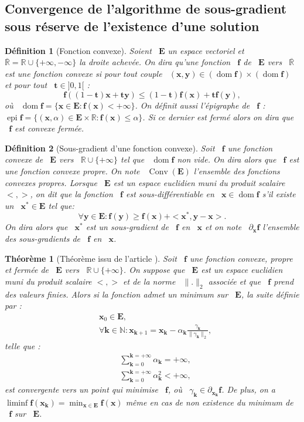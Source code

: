 \documentclass[publibook-draft]{CAp2012}
\newtheorem{definition}{Définition}
\newtheorem{theorem}{Théorème}
\newcommand{\dom}{\operatorname*{dom}}
\newcommand{\epi}{\operatorname{epi}}
\newcommand{\conv}{\operatorname*{Conv}}
\newcommand{\af}{\mathbf{f}}
\newcommand{\bk}{\mathbf{k}}
\newcommand{\bt}{\mathbf{t}}
\newcommand{\bx}{\mathbf{x}}
\newcommand{\by}{\mathbf{y}}
\newcommand{\me}{\mathbf{E}}
\begin{document}
\subsection{Convergence de l'algorithme de sous-gradient sous réserve de l'existence d'une solution}
\begin{definition}[Fonction convexe]
Soient ~$\me$ un espace vectoriel et ~$\overline{\mathbb{R}}=\mathbb{R}\cup\{+\infty,-\infty\}$ la droite achevée. On dira qu'une fonction ~$\af$ de ~$\me$ vers ~$\overline{\mathbb{R}}$ est une fonction convexe si pour tout couple ~$(\bx,\by)\in(\dom\af)\times(\dom\af)$ et pour tout ~$\bt\in]0,1[$ :
\begin{equation}
\af((1-\bt)\bx+\bt\by)\leq(1-\bt)\af(\bx)+\bt\af(\by),
\end{equation}
où ~$\dom\af=\{\bx\in\me:\af(\bx)<+\infty\}$.
On définit aussi l'épigraphe de ~$\af$ : ~$\epi \af=\{(\bx,\alpha)\in\me\times\mathbb{R}:\af(\bx)\leq\alpha\}$. Si ce dernier est fermé alors on dira que ~$\af$ est convexe fermée.
\end{definition}
\begin{definition}[Sous-gradient d'une fonction convexe]
Soit ~$\af$ une fonction convexe de ~$\me$ vers ~$\mathbb{R}\cup\{+\infty\}$ tel que ~$\dom\af$ non vide. On dira alors que ~$\af$ est une fonction convexe propre. On note ~$\conv(\me)$ l'ensemble des fonctions convexes propres. Lorsque ~$\me$ est un espace euclidien muni du produit scalaire $<,>$, on dit que la fonction ~$\af$ est sous-différentiable en ~$\bx\in\dom\af$ s'il existe un ~$\bx^*\in\me$ tel que:
\begin{equation}
\forall \by\in\me : \af(\by)\geq\af(\bx)+<\bx^*,\by-\bx>.
\end{equation}
On dira alors que ~$\bx^*$ est un sous-gradient de ~$\af$ en ~$\bx$ et on note ~$\partial_\bx\af$ l'ensemble des sous-gradients de ~$\af$ en ~$\bx$.
\end{definition}
\begin{theorem}[Théorème issu de l'article \cite{correa1993convergence}]\label{theoreme.sec}
Soit ~$\af$ une fonction convexe, propre et fermée de ~$\me$ vers ~$\mathbb{R}\cup\{+\infty\}$.
On suppose que ~$\me$ est un espace euclidien muni du produit scalaire $<,>$ et de la norme ~$\|.\|_2$ associée et que ~$\af$ prend des valeurs finies.
Alors si la fonction admet un minimum sur ~$\me$, la suite définie par :
\begin{align}
&\bx_0\in\me,
\\
&\forall \bk\in\mathbb{N} : \bx_{\bk+1}=\bx_\bk-\alpha_{\bk}\frac{\gamma_{\bk}}{\|\gamma_{\bk}\|_2},
\end{align}
telle que :
\begin{align}
&\sum_{\bk=0}^{\bk=+\infty}\alpha_{\bk}=+\infty,
\\
&\sum_{\bk=0}^{\bk=+\infty}\alpha_{\bk}^2<+\infty,
\end{align}
est convergente vers un point qui minimise ~$\af$, où ~$\gamma_{\bk}\in\partial_{\bx_\bk}\af$. De plus, on a ~$\liminf\af({\bx_\bk})=\min_{\bx\in\me}\af(\bx)$ même en cas de non existence du minimum de ~$\af$ sur ~$\me$.
\end{theorem}
\end{document}
